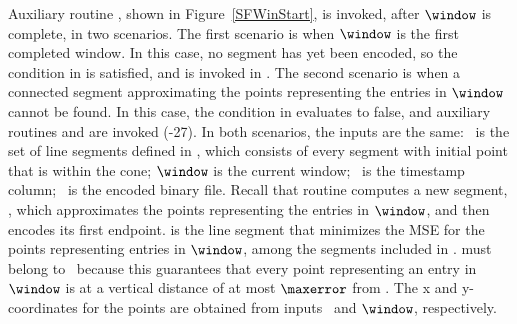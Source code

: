 Auxiliary routine \CAWinStart, shown in Figure~\ref{SFWinStart}, is invoked, after $\window$ is complete, in two scenarios. The first scenario is when $\window$ is the first completed window. In this case, no segment has yet been encoded, so the condition in  is satisfied, and \CAWinStart is invoked in . The second scenario is when a connected segment approximating the points representing the entries in $\window$ cannot be found. In this case, the condition in  evaluates to false, and auxiliary routines \CAWinEnd and \CAWinStart are invoked (-27). In both scenarios, the inputs are the same: \segmentSet\ is the set of line segments defined in , which consists of every segment with initial point \incoming that is within the cone; $\window$ is the current window; \tscol\ is the timestamp column; \out\ is the encoded binary file. Recall that routine \CAWinStart computes a new segment, \segmentS, which approximates the points representing the entries in $\window$, and then encodes its first endpoint. \segmentS is the line segment that minimizes the MSE for the points representing entries in $\window$, among the segments included in \segmentSet. \segmentS must belong to \segmentSet\ because this guarantees that every point representing an entry in $\window$ is at a vertical distance of at most $\maxerror$ from \segmentS. The x and y-coordinates for the points are obtained from inputs \tscol\ and $\window$, respectively.






